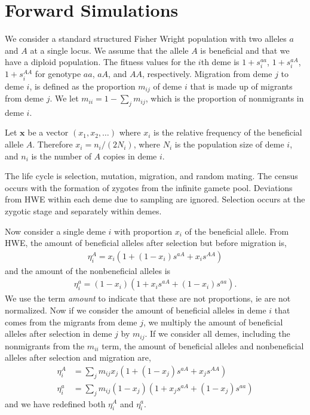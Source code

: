 \documentclass{article}
\begin{document}
\section{Forward Simulations}

\newcommand{\saa}{s^{aa}}
\newcommand{\saA}{s^{aA}}
\newcommand{\sAA}{s^{AA}}
\newcommand{\bs}[1]{\boldsymbol{#1}}

We consider a standard structured Fisher Wright population with two alleles $a$
and $A$ at a single locus. We assume that the allele $A$ is beneficial and that
we have a diploid population. The fitness values for the $i$th deme is
$1+\saa_i$, $1+\saA_i$, $1+\sAA_i$ for genotype $aa$, $aA$, and $AA$,
respectively. Migration  from deme $j$ to deme $i$, is defined as the proportion $m_{ij}$ of
deme $i$ that is made up of migrants from deme $j$. We let $m_{ii}=1-\sum_j
m_{ij}$, which is the proportion of nonmigrants in deme $i$.

Let $\bs{x}$ be a vector $(x_1,x_2,\ldots)$ where $x_i$ is the
relative frequency of the beneficial allele $A$. Therefore $x_i=n_i/(2N_i)$,
where $N_i$ is the population size of deme $i$, and $n_i$ is the number of $A$
copies in deme $i$.  

The life cycle is selection, mutation, migration, and random mating. The census
occurs with the formation of zygotes from the infinite gamete pool. Deviations
from HWE within each deme due to sampling are ignored. Selection occurs at the
zygotic stage and separately within demes. 

Now consider a single deme $i$ with proportion $x_i$ of the beneficial allele.
From HWE, the amount of beneficial alleles after selection but before migration
is,
\begin{align}
	\eta_{i}^A=x_i\left(1+(1-x_i)\saA+x_i\sAA\right)
\end{align}
and the amount of the nonbeneficial alleles is 
\begin{align}
	\eta_{i}^a=(1-x_i)\left(1+x_i\saA+(1-x_i)\saa\right). 
\end{align}
We use the term {\it amount} to indicate that these are not proportions, ie
are not normalized. Now if we consider the amount of beneficial alleles in deme $i$ that
comes from the migrants from deme $j$, we multiply the amount of
beneficial alleles after selection in deme $j$ by $m_{ij}$. If we consider all
demes, including the nonmigrants from the $m_{ii}$ term, the amount of
beneficial alleles and nonbeneficial alleles after selection and migration are, 
\begin{align}
	\eta^A_i&=\sum_j m_{ij} x_j \left(1+(1-x_j)\saA+x_j\sAA\right)
	\label{eq:selected}\\ 
	\eta^a_i&=\sum_j m_{ij}(1-x_j)\left(1+x_j\saA+(1-x_j)\saa\right)
	\label{eq:unselected}
\end{align}
and we have redefined both $\eta^A_i$ and $\eta^a_i$. 
\end{document}
